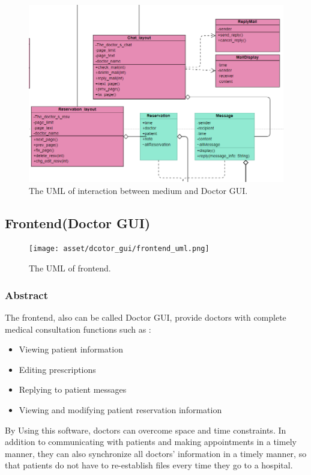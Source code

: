 \documentclass{article}
\begin{document}
\begin{figure}[h]
  \centering
  \includegraphics[scale = 0.35]{asset/frontend_and_medium/MED_usage_doctor_gui.png}
  \caption{The UML of interaction between medium and Doctor GUI.}
  \label{fig:uml_medium_and_doctor_gui}
\end{figure}

\subsection*{Frontend(Doctor GUI)}

\begin{figure}[h]
    \centering
    \texttt{[image: asset/dcotor\_gui/frontend\_uml.png]}
    \caption{The UML of frontend.}
    \label{fig:frontend_uml}
  \end{figure}

\subsubsection*{Abstract}
The frontend, also can be called Doctor GUI, provide doctors with complete medical consultation functions such as :

\begin{itemize}
    \item Viewing patient information
    \item Editing prescriptions
    \item Replying to patient messages
    \item Viewing and modifying patient reservation information
\end{itemize}

By Using this software, doctors can overcome space and time constraints. In addition to communicating with patients and making appointments in a timely manner, they can also synchronize all doctors' information in a timely manner, so that patients do not have to re-establish files every time they go to a hospital.
\end{document}
